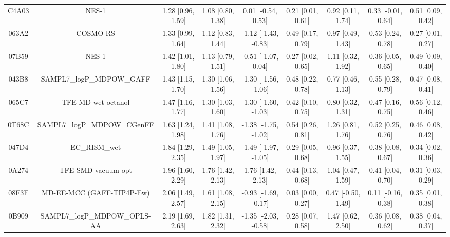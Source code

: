 \documentclass{article}
\begin{document}
\begin{center}
\begin{longtable}{|ccccccccc|}
 C4A03 &                                              NES-1 &  1.28 [0.96, 1.59] &  1.08 [0.80, 1.38] &    0.01 [-0.54, 0.53] &  0.21 [0.01, 0.61] &     0.92 [0.11, 1.74] &    0.33 [-0.01, 0.64] &     0.51 [0.09, 0.42] \\
 063A2 &                                           COSMO-RS &  1.33 [0.99, 1.64] &  1.12 [0.83, 1.44] &  -1.12 [-1.43, -0.83] &  0.49 [0.17, 0.79] &     0.97 [0.49, 1.43] &     0.53 [0.24, 0.78] &     0.27 [0.01, 0.27] \\
 07B59 &                                              NES-1 &  1.42 [1.01, 1.80] &  1.13 [0.79, 1.51] &   -0.51 [-1.07, 0.04] &  0.27 [0.02, 0.65] &     1.11 [0.32, 1.92] &     0.36 [0.05, 0.65] &     0.49 [0.09, 0.40] \\
 043B8 &                          SAMPL7\_logP\_MDPOW\_GAFF &  1.43 [1.15, 1.70] &  1.30 [1.06, 1.56] &  -1.30 [-1.56, -1.06] &  0.48 [0.22, 0.78] &     0.77 [0.46, 1.13] &     0.55 [0.28, 0.79] &     0.47 [0.08, 0.41] \\
 065C7 &                                 TFE-MD-wet-octanol &  1.47 [1.16, 1.77] &  1.30 [1.03, 1.60] &  -1.30 [-1.60, -1.03] &  0.42 [0.10, 0.75] &     0.80 [0.32, 1.31] &     0.47 [0.16, 0.75] &     0.56 [0.12, 0.46] \\
 0T68C &                        SAMPL7\_logP\_MDPOW\_CGenFF &  1.63 [1.24, 1.98] &  1.41 [1.08, 1.76] &  -1.38 [-1.75, -1.02] &  0.54 [0.26, 0.81] &     1.26 [0.81, 1.76] &     0.52 [0.25, 0.76] &     0.46 [0.08, 0.42] \\
 047D4 &                                      EC\_RISM\_wet &  1.84 [1.29, 2.35] &  1.49 [1.05, 1.97] &  -1.49 [-1.97, -1.05] &  0.29 [0.05, 0.68] &     0.96 [0.37, 1.55] &     0.38 [0.08, 0.67] &     0.34 [0.02, 0.36] \\
 0A274 &                                 TFE-SMD-vacuum-opt &  1.96 [1.60, 2.29] &  1.76 [1.42, 2.13] &     1.76 [1.42, 2.13] &  0.44 [0.13, 0.68] &     1.04 [0.47, 1.59] &     0.41 [0.04, 0.70] &     0.31 [0.03, 0.29] \\
 08F3F &                          MD-EE-MCC (GAFF-TIP4P-Ew) &  2.06 [1.49, 2.57] &  1.61 [1.08, 2.15] &  -0.93 [-1.69, -0.17] &  0.03 [0.00, 0.27] &    0.47 [-0.50, 1.49] &    0.11 [-0.16, 0.38] &     0.35 [0.01, 0.38] \\
 0B909 &                       SAMPL7\_logP\_MDPOW\_OPLS-AA &  2.19 [1.69, 2.63] &  1.82 [1.31, 2.32] &  -1.35 [-2.03, -0.58] &  0.28 [0.07, 0.58] &     1.47 [0.62, 2.50] &     0.36 [0.08, 0.62] &     0.38 [0.04, 0.37] \\

\end{longtable}
\end{center}
\end{document}

